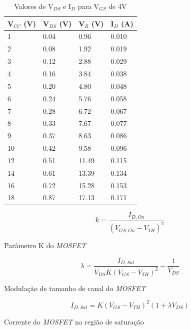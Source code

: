 \documentclass{article}
\begin{document}
\begin{table}[h!]
    \centering
    \begin{tabular}{|l|l|l|l|}
    \hline
        V$_{CC}$ (V) & V$_{DS}$ (V) & V$_{R}$ (V) & I$_{D}$ (A) \\ \hline
        1 & 0.04 & 0.96 & 0.010 \\ \hline
        2 & 0.08 & 1.92 & 0.019 \\ \hline
        3 & 0.12 & 2.88 & 0.029 \\ \hline
        4 & 0.16 & 3.84 & 0.038 \\ \hline
        5 & 0.20 & 4.80 & 0.048 \\ \hline
        6 & 0.24 & 5.76 & 0.058 \\ \hline
        7 & 0.28 & 6.72 & 0.067 \\ \hline
        8 & 0.33 & 7.67 & 0.077 \\ \hline
        9 & 0.37 & 8.63 & 0.086 \\ \hline
        10 & 0.42 & 9.58 & 0.096 \\ \hline
        12 & 0.51 & 11.49 & 0.115 \\ \hline
        14 & 0.61 & 13.39 & 0.134 \\ \hline
        16 & 0.72 & 15.28 & 0.153 \\ \hline
        18 & 0.87 & 17.13 & 0.171 \\ \hline
    \end{tabular}
    \caption{Valores de V$_{DS}$ e I$_D$ para V$_{GS}$ de 4V}
    \label{table: 3}
\end{table}

\begin{eqfloat}
    \begin{equation}
        k = \frac{I_{D,On}}{(V_{GS,On} - V_{TH})^2}
        \label{eq:k}
    \end{equation}
    \caption{Parâmetro K do \emph{MOSFET}}
\end{eqfloat}

\begin{eqfloat}
    \begin{equation}
        \lambda = \frac{I_{D,Sat}}{V_{DS} K (V_{GS} - V_{TH})^2} - \frac{1}{V_{DS}}
        \label{eq:lambda}
    \end{equation}
    \caption{Modulação de tamanho de canal do \emph{MOSFET}}
\end{eqfloat}

\begin{eqfloat}
    \begin{equation}
        I_{D,Sat} = K (V_{GS} - V_{TH})^2(1+\lambda V_{DS})
        \label{eq:corr_sat}
    \end{equation}
    \caption{Corrente do \emph{MOSFET} na região de saturação}
\end{eqfloat}
\end{document}
